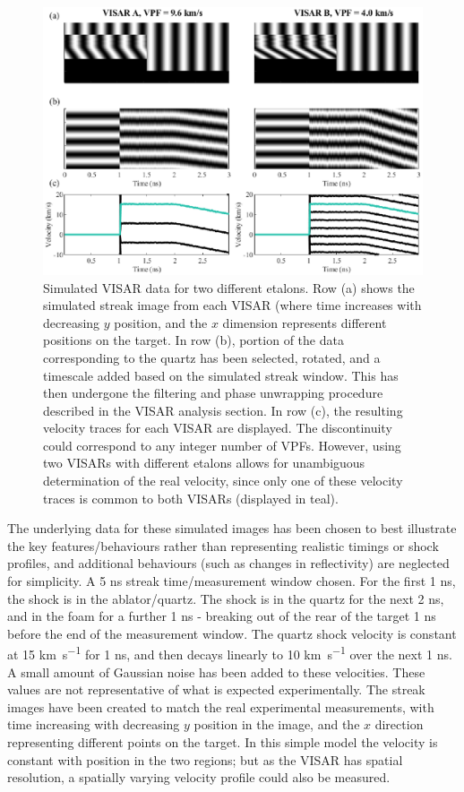 \begin{figure}
\includegraphics[width=1.0\textwidth]{figures/Experiment/VISARToy.eps}%
\caption{\label{fig:VISARToy} Simulated VISAR data for two different etalons. Row (a) shows the simulated streak image from each VISAR (where time increases with decreasing $y$ position, and the $x$ dimension represents different positions on the target. In row (b), portion of the data corresponding to the quartz has been selected, rotated, and a timescale added based on the simulated streak window. This has then undergone the filtering and phase unwrapping procedure described in the VISAR analysis section. In row (c), the resulting velocity traces for each VISAR are displayed. The discontinuity could correspond to any integer number of VPFs. However, using two VISARs with different etalons allows for unambiguous determination of the real velocity, since only one of these velocity traces is common to both VISARs (displayed in teal).}
\end{figure}

The underlying data for these simulated images has been chosen to best illustrate the key features/behaviours rather than representing realistic timings or shock profiles, and additional behaviours (such as changes in reflectivity) are neglected for simplicity. A 5 \unit{\nano\second} streak time/measurement window chosen. For the first 1 \unit{\nano\second}, the shock is in the ablator/quartz. The shock is in the quartz for the next 2 \unit{\nano\second}, and in the foam for a further 1 \unit{\nano\second} - breaking out of the rear of the target 1 \unit{\nano\second} before the end of the measurement window. The quartz shock velocity is constant at 15 \unit{\kilo\meter\per\second} for 1 \unit{\nano\second}, and then decays linearly to 10 \unit{\kilo\meter\per\second} over the next 1 \unit{\nano\second}. A small amount of Gaussian noise has been added to these velocities. These values are not representative of what is expected experimentally. The streak images have been created to match the real experimental measurements, with time increasing with decreasing $y$ position in the image, and the $x$ direction representing different points on the target. In this simple model the velocity is constant with position in the two regions; but as the VISAR has spatial resolution, a spatially varying velocity profile could also be measured.

